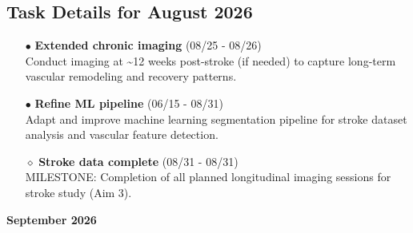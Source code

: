 \documentclass[landscape,a4paper]{article}
\begin{document}
\subsection{Task Details for August 2026}
\begin{itemize}[leftmargin=1cm]
    \item[\textcolor{other}{$\bullet$}] \textbf{Extended chronic imaging} (08/25 - 08/26)\\ Conduct imaging at \textasciitilde{}12 weeks post-stroke (if needed) to capture long-term vascular remodeling and recovery patterns.
    \item[\textcolor{other}{$\bullet$}] \textbf{Refine ML pipeline} (06/15 - 08/31)\\ Adapt and improve machine learning segmentation pipeline for stroke dataset analysis and vascular feature detection.
    \item[\textcolor{other}{$\diamond$}] \textbf{Stroke data complete} (08/31 - 08/31)\\ MILESTONE: Completion of all planned longitudinal imaging sessions for stroke study (Aim 3).
\end{itemize}

\newpage
\pagestyle{empty}

\begin{center}
{\large\textbf{September 2026}}
\end{center}

\vspace{0.5cm}
\end{document}
